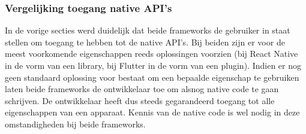 \subsubsection{Vergelijking toegang native API's}
\label{subsubsec:vglToegangNativeAPIs}

In de vorige secties werd duidelijk dat beide frameworks de gebruiker in staat stellen om toegang te hebben tot de native API's. Bij beiden zijn er voor de meest voorkomende eigenschappen reeds oplossingen voorzien (bij React Native in de vorm van een library, bij Flutter in de vorm van een plugin). Indien er nog geen standaard oplossing voor bestaat om een bepaalde eigenschap te gebruiken laten beide frameworks de ontwikkelaar toe om alsnog native code te gaan schrijven. De ontwikkelaar heeft dus steeds gegarandeerd toegang tot alle eigenschappen van een apparaat. Kennis van de native code is wel nodig in deze omstandigheden bij beide frameworks.


